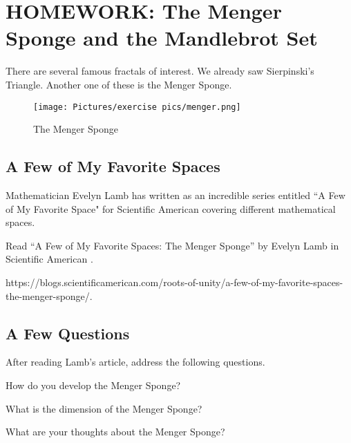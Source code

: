 
\section{HOMEWORK: The Menger Sponge and the Mandlebrot Set}

There are several famous fractals of interest. We already saw Sierpinski's Triangle. Another one of these is the Menger Sponge.

\begin{figure}[h]
    \centering
    \texttt{[image: Pictures/exercise pics/menger.png]}
    \caption{The Menger Sponge}
    \label{fig:menger}
\end{figure}

\subsection{A Few of My Favorite Spaces}

Mathematician Evelyn Lamb has written as an incredible series entitled ``A Few of My Favorite Space" for Scientific American covering different mathematical spaces.

\begin{exercise}
Read “A Few of My Favorite Spaces: The Menger Sponge” by Evelyn Lamb in Scientific American \cite{menger}.
\end{exercise}
{\footnotesize  https://blogs.scientificamerican.com/roots-of-unity/a-few-of-my-favorite-spaces-the-menger-sponge/.}

\subsection{A Few Questions}

After reading Lamb's article, address the following questions.

\begin{exercise}
How do you develop the Menger Sponge?
\end{exercise}

\blanks
\blanks

\begin{exercise}
What is the dimension of the Menger Sponge?
\end{exercise}

\blanks
\blanks

\begin{exercise}
What are your thoughts about the Menger Sponge?
\end{exercise}

